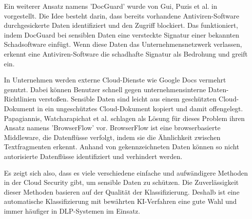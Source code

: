 Ein weiterer Ansatz namens 'DocGuard' wurde von Gui, Puzis et al. in \cite{Guri.2019} vorgestellt. Die Idee besteht darin, dass bereits vorhandene Antiviren-Software durchgesickerte Daten identifiziert und den Zugriff blockiert. Das funktioniert, indem DocGuard bei sensiblen Daten eine versteckte Signatur einer bekannten Schadsoftware einfügt. Wenn diese Daten das Unternehmensnetzwerk verlassen, erkennt eine Antiviren-Software die schadhafte Signatur als Bedrohung und greift ein.

In Unternehmen werden externe Cloud-Dienste wie Google Docs vermehrt genutzt. Dabei können Benutzer schnell gegen unternehmensinterne Daten-Richtlinien verstoßen. Sensible Daten sind leicht aus einem geschützten Cloud-Dokument in ein ungeschütztes Cloud-Dokument kopiert und damit offengelegt. Papagiannis, Watcharapichat et al. \cite{Papagiannis.2016} schlagen als Lösung für dieses Problem ihren Ansatz namens 'BrowserFlow' vor. BrowserFlow ist eine browserbasierte Middleware, die Datenflüsse verfolgt, indem sie die Ähnlichkeit zwischen Textfragmenten erkennt. Anhand von gekennzeichneten Daten können so nicht autorisierte Datenflüsse identifiziert und verhindert werden.

Es zeigt sich also, dass es viele verschiedene einfache und aufwändigere Methoden in der Cloud Security gibt, um sensible Daten zu schützen. Die Zuverlässigkeit dieser Methoden basieren auf der Qualität der Klassifizierung. Deshalb ist eine automatische Klassifizierung mit bewährten KI-Verfahren eine gute Wahl und immer häufiger in DLP-Systemen im Einsatz.
